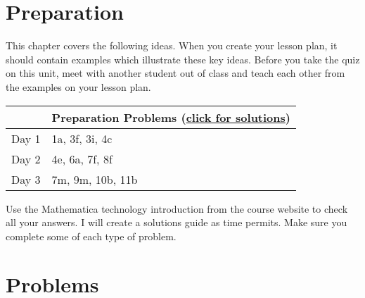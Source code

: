 
\section{Preparation}

\noindent  
This chapter covers the following ideas. When you create your lesson plan, it should contain examples which illustrate these key ideas. Before you take the quiz on this unit, meet with another student out of class and teach each other from the examples on your lesson plan. 



\begin{center}
\begin{tabular}{ll}
&Preparation Problems 
(\href{https://ilearn.byui.edu/bbcswebdav/institution/Physical\_Sci\_Eng/Mathematics/Personal\%20Folders/WoodruffB/316/11-Fourier-Series-Preparation-Solutions.pdf}{click for solutions})
\\
\hline\hline
Day 1& 
1a,
3f,
3i,
4c
\\\hline
Day 2&
4e,
6a,
7f,
8f
\\\hline
Day 3&
7m,
9m,
10b,
11b
\\\hline
\end{tabular}
\end{center}


Use the Mathematica technology introduction from the course website to check all your answers. I will create a solutions guide as time permits. Make sure you complete some of each type of problem.

\section{Problems}

